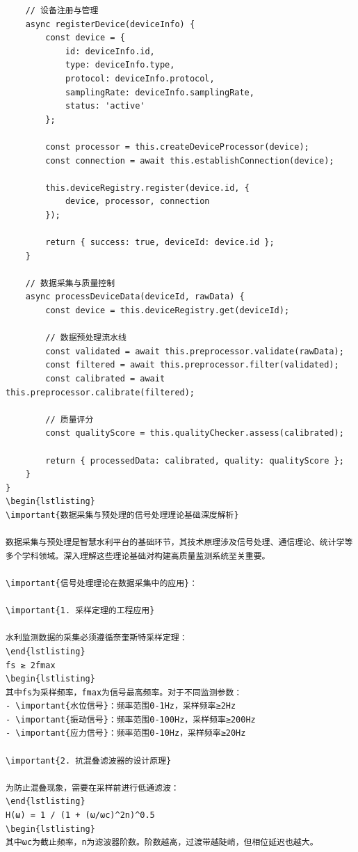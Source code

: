 \begin{verbatim}
    // 设备注册与管理
    async registerDevice(deviceInfo) {
        const device = {
            id: deviceInfo.id,
            type: deviceInfo.type,
            protocol: deviceInfo.protocol,
            samplingRate: deviceInfo.samplingRate,
            status: 'active'
        };
        
        const processor = this.createDeviceProcessor(device);
        const connection = await this.establishConnection(device);
        
        this.deviceRegistry.register(device.id, {
            device, processor, connection
        });
        
        return { success: true, deviceId: device.id };
    }
    
    // 数据采集与质量控制
    async processDeviceData(deviceId, rawData) {
        const device = this.deviceRegistry.get(deviceId);
        
        // 数据预处理流水线
        const validated = await this.preprocessor.validate(rawData);
        const filtered = await this.preprocessor.filter(validated);
        const calibrated = await this.preprocessor.calibrate(filtered);
        
        // 质量评分
        const qualityScore = this.qualityChecker.assess(calibrated);
        
        return { processedData: calibrated, quality: qualityScore };
    }
}
\begin{lstlisting}
\important{数据采集与预处理的信号处理理论基础深度解析}

数据采集与预处理是智慧水利平台的基础环节，其技术原理涉及信号处理、通信理论、统计学等多个学科领域。深入理解这些理论基础对构建高质量监测系统至关重要。

\important{信号处理理论在数据采集中的应用}：

\important{1. 采样定理的工程应用}

水利监测数据的采集必须遵循奈奎斯特采样定理：
\end{lstlisting}
fs ≥ 2fmax
\begin{lstlisting}
其中fs为采样频率，fmax为信号最高频率。对于不同监测参数：
- \important{水位信号}：频率范围0-1Hz，采样频率≥2Hz
- \important{振动信号}：频率范围0-100Hz，采样频率≥200Hz
- \important{应力信号}：频率范围0-10Hz，采样频率≥20Hz

\important{2. 抗混叠滤波器的设计原理}

为防止混叠现象，需要在采样前进行低通滤波：
\end{lstlisting}
H(ω) = 1 / (1 + (ω/ωc)^2n)^0.5
\begin{lstlisting}
其中ωc为截止频率，n为滤波器阶数。阶数越高，过渡带越陡峭，但相位延迟也越大。


\end{verbatim}
